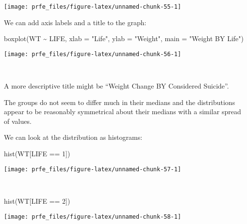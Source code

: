 \documentclass[
  12pt,
  a4paper]{book}
\newenvironment{Shaded}{\begin{snugshade}}{\end{snugshade}}
\newcommand{\AttributeTok}[1]{\textcolor[rgb]{0.77,0.63,0.00}{#1}}
\newcommand{\DecValTok}[1]{\textcolor[rgb]{0.00,0.00,0.81}{#1}}
\newcommand{\FunctionTok}[1]{\textcolor[rgb]{0.00,0.00,0.00}{#1}}
\newcommand{\NormalTok}[1]{#1}
\newcommand{\SpecialCharTok}[1]{\textcolor[rgb]{0.00,0.00,0.00}{#1}}
\newcommand{\StringTok}[1]{\textcolor[rgb]{0.31,0.60,0.02}{#1}}
\begin{document}
\begin{center}\texttt{[image: prfe\_files/figure-latex/unnamed-chunk-55-1]} \end{center}

\newpage

We can add axis labels and a title to the graph:

\begin{Shaded}
\begin{Highlighting}[]
\FunctionTok{boxplot}\NormalTok{(WT }\SpecialCharTok{\textasciitilde{}}\NormalTok{ LIFE,}
        \AttributeTok{xlab =} \StringTok{"Life"}\NormalTok{,}
        \AttributeTok{ylab =} \StringTok{"Weight"}\NormalTok{,}
        \AttributeTok{main =} \StringTok{"Weight BY Life"}\NormalTok{)}
\end{Highlighting}
\end{Shaded}

\begin{center}\texttt{[image: prfe\_files/figure-latex/unnamed-chunk-56-1]} \end{center}

~

A more descriptive title might be ``Weight Change BY Considered Suicide''.

The groups do not seem to differ much in their medians and the distributions appear to be reasonably symmetrical about their medians with a similar spread of values.

\newpage

We can look at the distribution as histograms:

\begin{Shaded}
\begin{Highlighting}[]
\FunctionTok{hist}\NormalTok{(WT[LIFE }\SpecialCharTok{==} \DecValTok{1}\NormalTok{])}
\end{Highlighting}
\end{Shaded}

\begin{center}\texttt{[image: prfe\_files/figure-latex/unnamed-chunk-57-1]} \end{center}

~

\begin{Shaded}
\begin{Highlighting}[]
\FunctionTok{hist}\NormalTok{(WT[LIFE }\SpecialCharTok{==} \DecValTok{2}\NormalTok{])}
\end{Highlighting}
\end{Shaded}

\begin{center}\texttt{[image: prfe\_files/figure-latex/unnamed-chunk-58-1]} \end{center}
\end{document}
